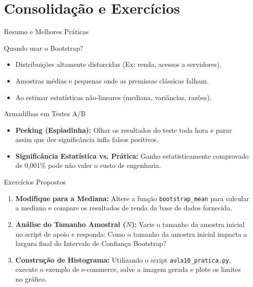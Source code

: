 \section{Consolidação e Exercícios}

\begin{frame}{Resumo e Melhores Práticas}
    \begin{block}{Quando usar o Bootstrap?}
        \begin{itemize}
            \item Distribuições altamente distorcidas (Ex: renda, acessos a servidores).
            \item Amostras médias e pequenas onde as premissas clássicas falham.
            \item Ao estimar estatísticas não-lineares (mediana, variâncias, razões).
        \end{itemize}
    \end{block}
    
    \begin{alertblock}{Armadilhas em Testes A/B}
        \begin{itemize}
            \item \textbf{Peeking (Espiadinha):} Olhar os resultados do teste toda hora e parar assim que der significância infla falsos positivos.
            \item \textbf{Significância Estatística vs. Prática:} Ganho estatisticamente comprovado de 0,001\% pode não valer o custo de engenharia.
        \end{itemize}
    \end{alertblock}
\end{frame}

\begin{frame}{Exercícios Propostos}
    \begin{enumerate}
        \item \textbf{Modifique para a Mediana:} Altere a função \texttt{bootstrap\_mean} para calcular a mediana e compare os resultados de renda da base de dados fornecida.
        \item \textbf{Análise do Tamanho Amostral ($N$):} Varie o tamanho da amostra inicial no script de apoio e responda: Como o tamanho da amostra inicial impacta a largura final do Intervalo de Confiança Bootstrap?
        \item \textbf{Construção de Histograma:} Utilizando o script \texttt{aula10\_pratica.py}, execute o exemplo de e-commerce, salve a imagem gerada e plote os limites no gráfico.
    \end{enumerate}
\end{frame}
